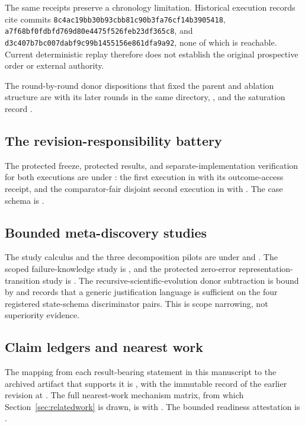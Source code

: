 The same receipts preserve a chronology limitation. Historical execution
records cite commits
\texttt{8c4ac19bb30b93cbb81c90b3fa76cf14b3905418},
\texttt{a7f68bf0fdbfd769d80e4475f526feb23df365c8}, and
\texttt{d3c407b7bc007dabf9c99b1455156e861dfa9a92}, none of which is reachable.
Current deterministic replay therefore does not establish the original
prospective order or external authority.

The round-by-round donor dispositions that fixed the parent and ablation
structure are 
with its later rounds in the same directory,
, and the saturation record
.

\subsection{The revision-responsibility battery}
The protected freeze, protected results, and separate-implementation verification
for both executions are under : the first execution in
 with its outcome-access receipt, and
the comparator-fair disjoint second execution in
 with
. The case schema is
.

\subsection{Bounded meta-discovery studies}
The study calculus and the three decomposition pilots are under
 and
. The scoped failure-knowledge
study is , and the
protected zero-error representation-transition study is
.
The recursive-scientific-evolution donor subtraction is bound by
 and records that a generic justification
language is sufficient on the four registered state-schema discriminator pairs.
This is scope narrowing, not superiority evidence.

\subsection{Claim ledgers and nearest work}
The mapping from each result-bearing statement in this manuscript to the
archived artifact that supports it is , with the
immutable record of the earlier revision at .
The full nearest-work mechanism matrix, from which
Section~\ref{sec:relatedwork} is drawn, is
 with
. The bounded readiness attestation is
.

